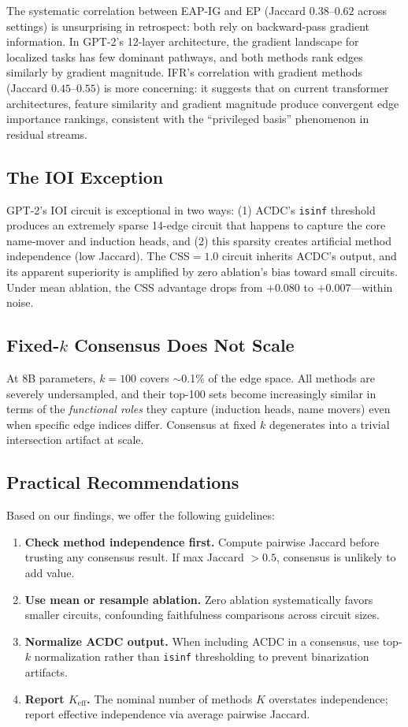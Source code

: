 \documentclass[11pt]{article}
\begin{document}
The systematic correlation between EAP-IG and EP (Jaccard $0.38$--$0.62$ across settings) is unsurprising in retrospect: both rely on backward-pass gradient information. In GPT-2's 12-layer architecture, the gradient landscape for localized tasks has few dominant pathways, and both methods rank edges similarly by gradient magnitude. IFR's correlation with gradient methods (Jaccard $0.45$--$0.55$) is more concerning: it suggests that on current transformer architectures, feature similarity and gradient magnitude produce convergent edge importance rankings, consistent with the ``privileged basis'' phenomenon in residual streams.

\subsection{The IOI Exception}

GPT-2's IOI circuit is exceptional in two ways: (1) ACDC's \texttt{isinf} threshold produces an extremely sparse 14-edge circuit that happens to capture the core name-mover and induction heads, and (2) this sparsity creates artificial method independence (low Jaccard). The CSS$=1.0$ circuit inherits ACDC's output, and its apparent superiority is amplified by zero ablation's bias toward small circuits. Under mean ablation, the CSS advantage drops from $+0.080$ to $+0.007$---within noise.

\subsection{Fixed-$k$ Consensus Does Not Scale}

At 8B parameters, $k=100$ covers $\sim$0.1\% of the edge space. All methods are severely undersampled, and their top-100 sets become increasingly similar in terms of the \emph{functional roles} they capture (induction heads, name movers) even when specific edge indices differ. Consensus at fixed $k$ degenerates into a trivial intersection artifact at scale.

\subsection{Practical Recommendations}

Based on our findings, we offer the following guidelines:
\begin{enumerate}
    \item \textbf{Check method independence first.} Compute pairwise Jaccard before trusting any consensus result. If max Jaccard $> 0.5$, consensus is unlikely to add value.
    \item \textbf{Use mean or resample ablation.} Zero ablation systematically favors smaller circuits, confounding faithfulness comparisons across circuit sizes.
    \item \textbf{Normalize ACDC output.} When including ACDC in a consensus, use top-$k$ normalization rather than \texttt{isinf} thresholding to prevent binarization artifacts.
    \item \textbf{Report $K_{\text{eff}}$.} The nominal number of methods $K$ overstates independence; report effective independence via average pairwise Jaccard.
\end{enumerate}
\end{document}
